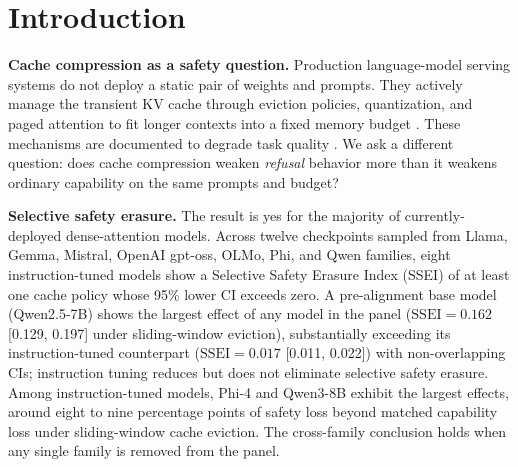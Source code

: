 \documentclass{article}
\newcommand{\ssei}{\mathrm{SSEI}}
\begin{document}
\section{Introduction}

\textbf{Cache compression as a safety question.} Production language-model serving systems do not deploy a static pair of weights and prompts. They actively manage the transient KV cache through eviction policies, quantization, and paged attention to fit longer contexts into a fixed memory budget \citep{kwon2023pagedattention,zhang2023h2o,xiao2024streamingllm}. These mechanisms are documented to degrade task quality \citep{chen2025pitfalls,yang2024notoken,ananthanarayanan2026physics}. We ask a different question: does cache compression weaken \emph{refusal} behavior more than it weakens ordinary capability on the same prompts and budget?

\textbf{Selective safety erasure.} The result is yes for the majority of currently-deployed dense-attention models. Across twelve checkpoints sampled from Llama, Gemma, Mistral, OpenAI gpt-oss, OLMo, Phi, and Qwen families, eight instruction-tuned models show a Selective Safety Erasure Index (SSEI) of at least one cache policy whose 95\% lower CI exceeds zero. A pre-alignment base model (Qwen2.5-7B) shows the largest effect of any model in the panel ($\ssei = 0.162$ [0.129, 0.197] under sliding-window eviction), substantially exceeding its instruction-tuned counterpart ($\ssei = 0.017$ [0.011, 0.022]) with non-overlapping CIs; instruction tuning reduces but does not eliminate selective safety erasure. Among instruction-tuned models, Phi-4 and Qwen3-8B exhibit the largest effects, around eight to nine percentage points of safety loss beyond matched capability loss under sliding-window cache eviction. The cross-family conclusion holds when any single family is removed from the panel.
\end{document}
